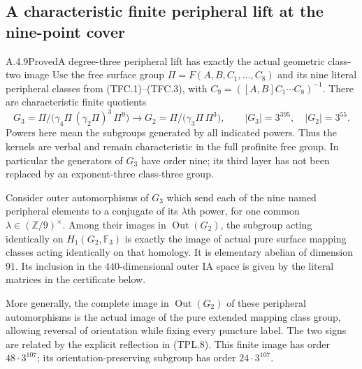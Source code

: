 \subsection{A characteristic finite peripheral lift at the nine-point cover}

\begin{result}{A.4.9}{Proved}{A degree-three peripheral lift has exactly the actual geometric class-two image}
Use the free surface group
$\Pi=F(A,B,C_1,\ldots,C_8)$ and its nine literal peripheral
classes from (TFC.1)--(TFC.3), with
$C_9=([A,B]C_1\cdots C_8)^{-1}$.
There are characteristic finite quotients
\[
 G_3=\Pi/\bigl(\gamma_4\Pi\,(\gamma_2\Pi)^3\,\Pi^9\bigr)
 \longrightarrow
 G_2=\Pi/\bigl(\gamma_3\Pi\,\Pi^3\bigr),
 \qquad |G_3|=3^{395},\quad |G_2|=3^{55}.
                                                        \tag{TPL.1}
\]
Powers here mean the subgroups generated by all indicated powers.
Thus the kernels are verbal and remain characteristic in the full
profinite free group.  In particular the generators of $G_3$ have
order nine; its third layer has not been replaced by an
exponent-three class-three group.

Consider outer automorphisms of $G_3$ which send each of the nine
named peripheral elements to a conjugate of its $\lambda$th
power, for one common $\lambda\in(\mathbb Z/9)^\times$.
Among their images in $\operatorname{Out}(G_2)$, the subgroup
acting identically on $H_1(G_2,\mathbb F_3)$ is exactly the image
of actual pure surface mapping classes acting identically on
that homology.  It is elementary abelian of dimension $91$.
Its inclusion in the $440$-dimensional outer IA space is given
by the literal matrices in the certificate below.

More generally, the complete image in $\operatorname{Out}(G_2)$
of these peripheral automorphisms is the actual image of the
pure extended mapping class group, allowing reversal of
orientation while fixing every puncture label.  The two signs
are related by the explicit reflection in (TPL.8).
This finite image has order $48\cdot3^{107}$; its
orientation-preserving subgroup has order $24\cdot3^{107}$.
\end{result}


